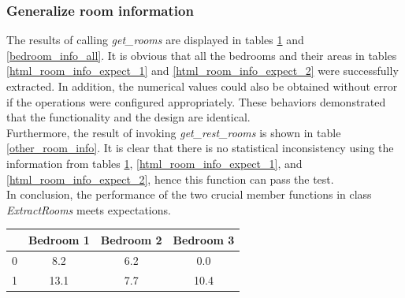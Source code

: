 \documentclass[12pt,twoside]{report}
\begin{document}
\subsubsection{Generalize room information}
The results of calling \textit{get\_rooms} are displayed in tables \ref{bedroom_info_split} and \ref{bedroom_info_all}. It is obvious that all the bedrooms and their areas in tables \ref{html_room_info_expect_1} and \ref{html_room_info_expect_2} were successfully extracted. In addition, the numerical values could also be obtained without error if the operations were configured appropriately. These behaviors demonstrated that the functionality and the design are identical. 
\\

Furthermore, the result of invoking \textit{get\_rest\_rooms} is shown in table \ref{other_room_info}. It is clear that there is no statistical inconsistency using the information from tables \ref{bedroom_info_split}, \ref{html_room_info_expect_1}, and \ref{html_room_info_expect_2}, hence this function can pass the test. 
\\ 

In conclusion, the performance of the two crucial member functions in class \textit{ExtractRooms} meets expectations.
\\

\begin{table}[h]
	\centering
	\label{bedroom_info_split}
	\begin{tabular}{| c | c | c | c |}
		\hline
		& Bedroom 1 & Bedroom 2 & Bedroom 3 \\
		\hline
		0 & 8.2 & 6.2 & 0.0 \\
		\hline
		1 & 13.1 & 7.7 & 10.4 \\
		\hline
	\end{tabular}
\end{table}
\end{document}
